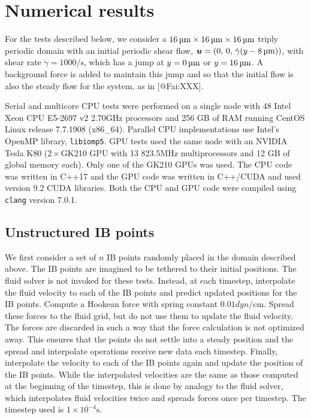 \clearpage
\section{Numerical results}

For the tests described below, we consider a $16\um\times16\um\times16\um$
triply periodic domain with an initial periodic shear flow,
$\vec{u} = (0,\,0,\,\dot{\gamma}(y-8\um))$, with shear rate
$\dot{\gamma} = 1000\si{\per\second}$, which has a jump at $y=0\um$ or
$y=16\um$. A background force is added to maintain this jump and so that the
initial flow is also the steady flow for the system, as in [@Fai:XXX].

Serial and multicore CPU tests were performed on a single node with 48
Intel\textsuperscript{\textregistered} Xeon\textsuperscript{\textregistered}
CPU E5-2697 v2 2.70\si{\giga\hertz} processors and 256 GB of RAM running CentOS
Linux release 7.7.1908 (x86\_64). Parallel CPU implementations use Intel's
OpenMP library, \texttt{libiomp5}. GPU tests used the same node with an
NVIDIA\textsuperscript{\textregistered} Tesla\textsuperscript{\textregistered}
K80 ($2\times$GK210 GPU with 13 823.5\si{\mega\hertz} multiprocessors and 12
GB of global memory each). Only one of the GK210 GPUs was used. The CPU code
was written in C++17 and the GPU code was written in C++/CUDA and used version
9.2 CUDA libraries. Both the CPU and GPU code were compiled using
\texttt{clang} version 7.0.1.

\subsection{Unstructured IB points}

We first consider a set of $n$ IB points randomly placed in the domain
described above. The IB points are imagined to be tethered to their initial
positions. The fluid solver is not invoked for these tests. Instead, at each
timestep, interpolate the fluid velocity to each of the IB points and predict
updated positions for the IB points. Compute a Hookean force with spring
constant $0.01\si{dyn\per\centi\meter}$. Spread these forces to the fluid grid,
but do not use them to update the fluid velocity. The forces are discarded in
such a way that the force calculation is not optimized away. This ensures that
the points do not settle into a steady position and the spread and interpolate
operations receive new data each timestep. Finally, interpolate the velocity to
each of the IB points again and update the position of the IB points. While the
interpolated velocities are the same as those computed at the beginning of the
timestep, this is done by analogy to the fluid solver, which interpolates fluid
velocities twice and spreads forces once per timestep. The timestep used is
$1\times 10^{-4}\si{\second}$.

